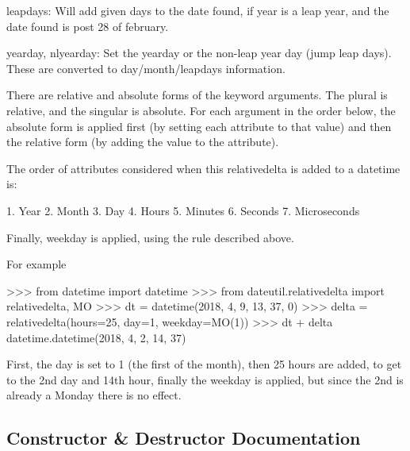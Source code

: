 \begin{DoxyVerb}
    leapdays:
        Will add given days to the date found, if year is a leap
        year, and the date found is post 28 of february.

    yearday, nlyearday:
        Set the yearday or the non-leap year day (jump leap days).
        These are converted to day/month/leapdays information.

There are relative and absolute forms of the keyword
arguments. The plural is relative, and the singular is
absolute. For each argument in the order below, the absolute form
is applied first (by setting each attribute to that value) and
then the relative form (by adding the value to the attribute).

The order of attributes considered when this relativedelta is
added to a datetime is:

1. Year
2. Month
3. Day
4. Hours
5. Minutes
6. Seconds
7. Microseconds

Finally, weekday is applied, using the rule described above.

For example

>>> from datetime import datetime
>>> from dateutil.relativedelta import relativedelta, MO
>>> dt = datetime(2018, 4, 9, 13, 37, 0)
>>> delta = relativedelta(hours=25, day=1, weekday=MO(1))
>>> dt + delta
datetime.datetime(2018, 4, 2, 14, 37)

First, the day is set to 1 (the first of the month), then 25 hours
are added, to get to the 2nd day and 14th hour, finally the
weekday is applied, but since the 2nd is already a Monday there is
no effect.\end{DoxyVerb}
 

\subsection{Constructor \& Destructor Documentation}
\mbox{\label{classdateutil_1_1relativedelta_1_1relativedelta_a44ec56e0355bbd9beb34de99bd5f46ed}} 
